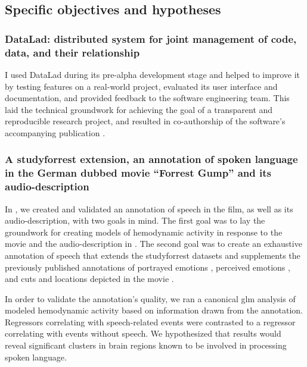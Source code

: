 \subsection{Specific objectives and hypotheses}




\subsubsection{DataLad: distributed system for joint management of code, data,
and their relationship}

%
I used DataLad during its pre-alpha development stage and helped to improve it
by testing features on a real-world project, evaluated its user interface and
documentation, and provided feedback to the software engineering team.
%
This laid the technical groundwork for achieving the goal of a transparent and
reproducible research project, and resulted in co-authorship of the software's
accompanying publication \citep[cf.][]{halchenko2021datalad}.


\subsubsection{A studyforrest extension, an annotation of spoken language in the
German dubbed movie ``Forrest Gump'' and its audio-description}

In \citet{haeusler2021speechanno}, we created and validated an annotation of
speech in the film, as well as its audio-description, with two goals in mind.
The first goal was to lay the groundwork for creating models of hemodynamic
activity in response to the movie and the audio-description in
\citet{haeusler2022processing}.
The second goal was to create an exhaustive annotation of speech that extends
the studyforrest datasets and supplements the previously published annotations
of portrayed emotions \citep{labs2015portrayed}, perceived emotions
\citep{lettieri2019emotionotopy}, and cuts and locations depicted in the movie
\citep{haeusler2016cutanno}.

In order to validate the annotation's quality, we ran a canonical \ac{glm}
analysis of modeled hemodynamic activity based on information drawn from the
annotation.
Regressors correlating with speech-related events were contrasted to a regressor
correlating with events without speech.
We hypothesized that results would reveal significant clusters in brain regions
known to be involved in processing spoken language.


